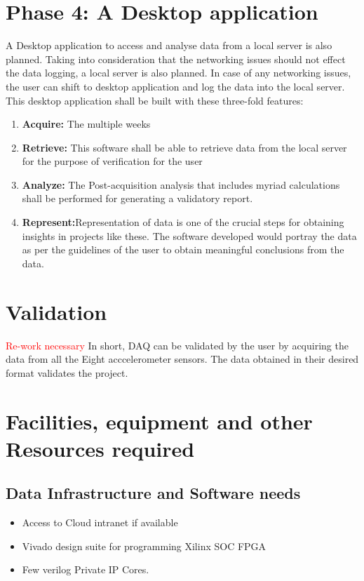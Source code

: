\documentclass{FR16}
\begin{document}
\section{Phase 4: A Desktop application}
A Desktop application to access and analyse data from a local server is also planned. Taking into consideration that the networking issues should not effect the data logging, a local server is also planned. In case of any networking issues, the user can shift to desktop application and log the data into the local server. This desktop application shall  be built with these three-fold features:
\begin{enumerate}
    \item \textbf{Acquire:} The multiple weeks 
    \item \textbf{Retrieve:} This software shall be able to retrieve data from the local server for the purpose of verification for the user
    \item \textbf{Analyze:} The Post-acquisition analysis that includes myriad calculations shall be performed for generating a validatory report.
    \item \textbf{Represent:}Representation of data is one of the crucial steps for obtaining insights in projects like these. The software developed would portray the data as per the guidelines of the user to obtain meaningful conclusions from the data.
\end{enumerate}












\newpage

 \section{Validation}
 \textcolor{red}{Re-work necessary}
In short, DAQ can be validated by the user by acquiring the data from all the Eight acccelerometer sensors. The data obtained in their desired format validates the project.


\newpage
\section{Facilities, equipment and other Resources required}

\subsection{Data Infrastructure and Software needs}
\begin{itemize}
    \item Access to  Cloud intranet if available
    \item Vivado design suite for programming Xilinx SOC FPGA
    \item Few verilog  Private IP Cores.
\end{itemize}
\end{document}
